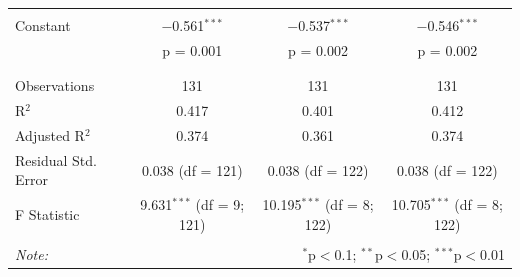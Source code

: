\begin{table}[!htbp]
\begin{tabular}{@{\extracolsep{5pt}}lccc}
  & & & \\ 
 Constant & $-$0.561$^{***}$ & $-$0.537$^{***}$ & $-$0.546$^{***}$ \\ 
  & p = 0.001 & p = 0.002 & p = 0.002 \\ 
  & & & \\ 
\hline \\[-1.8ex] 
Observations & 131 & 131 & 131 \\ 
R$^{2}$ & 0.417 & 0.401 & 0.412 \\ 
Adjusted R$^{2}$ & 0.374 & 0.361 & 0.374 \\ 
Residual Std. Error & 0.038 (df = 121) & 0.038 (df = 122) & 0.038 (df = 122) \\ 
F Statistic & 9.631$^{***}$ (df = 9; 121) & 10.195$^{***}$ (df = 8; 122) & 10.705$^{***}$ (df = 8; 122) \\ 
\hline 
\hline \\[-1.8ex] 
\textit{Note:}  & \multicolumn{3}{r}{$^{*}$p$<$0.1; $^{**}$p$<$0.05; $^{***}$p$<$0.01} \\ 
\end{tabular} 
\end{table} 

